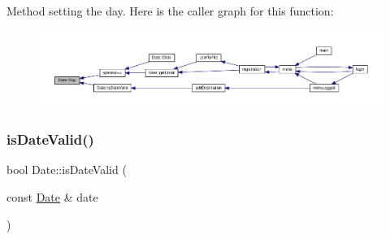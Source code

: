 Method setting the day. Here is the caller graph for this function\+:\nopagebreak
\begin{figure}[H]
\begin{center}
\leavevmode
\includegraphics[width=350pt]{class_date_ad7f2e4e42aadc85322503dbef8484ad5_icgraph}
\end{center}
\end{figure}
\mbox{\label{class_date_a2d9a87adab3ae18acdb13e027ad1d0aa}} 
\subsubsection{\texorpdfstring{is\+Date\+Valid()}{isDateValid()}}
{\footnotesize\ttfamily bool Date\+::is\+Date\+Valid (\begin{DoxyParamCaption}\item[{const \hyperlink{class_date}{Date} \&}]{date }\end{DoxyParamCaption})}

